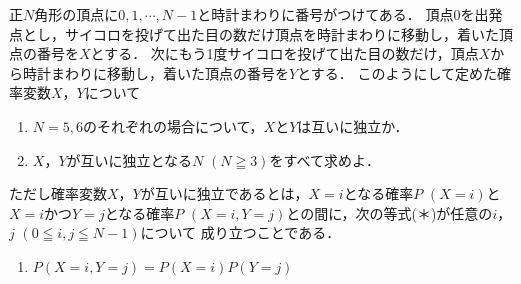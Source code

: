 \documentclass[../../main.tex]{subfiles}
\begin{document}
正$N$角形の頂点に$0,1,\cdots,N-1$と時計まわりに番号がつけてある．
頂点0を出発点とし，サイコロを投げて出た目の数だけ頂点を時計まわりに移動し，着いた頂点の番号を$X$とする．
次にもう1度サイコロを投げて出た目の数だけ，頂点$X$から時計まわりに移動し，着いた頂点の番号を$Y$とする．
このようにして定めた確率変数$X$，$Y$について
\begin{enumerate}
  \item $N=5,6$のそれぞれの場合について，$X$と$Y$は互いに独立か．
  \item $X$，$Y$が互いに独立となる$N$ $(N\geqq3)$をすべて求めよ．
\end{enumerate}
ただし確率変数$X$，$Y$が互いに独立であるとは，$X=i$となる確率$P$ $(X=i)$と
$X=i$かつ$Y=j$となる確率$P$ $(X=i,Y=j)$との間に，次の等式(＊)が任意の$i$，$j$ $(0\leqq i,j\leqq N-1)$について
成り立つことである．
\begin{enumerate}
  \item[(＊)]$P(X=i,Y=j)=P(X=i)P(Y=j)$
\end{enumerate}
\end{document}
